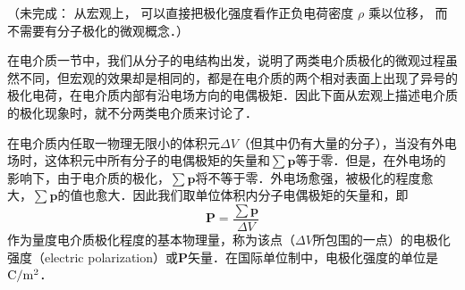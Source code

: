 

（未完成： 从宏观上， 可以直接把极化强度看作正负电荷密度 $\rho$ 乘以位移， 而不需要有分子极化的微观概念．）

在电介质一节中，我们从分子的电结构出发，说明了两类电介质极化的微观过程虽然不同，但宏观的效果却是相同的，都是在电介质的两个相对表面上出现了异号的极化电荷，在电介质内部有沿电场方向的电偶极矩．因此下面从宏观上描述电介质的极化现象时，就不分两类电介质来讨论了．

在电介质内任取一物理无限小的体积元$\Delta V$（但其中仍有大量的分子），当没有外电场时，这体积元中所有分子的电偶极矩的矢量和$\sum \mathbf p$等于零．但是，在外电场的影响下，由于电介质的极化，$\sum \mathbf p$将不等于零．外电场愈强，被极化的程度愈大，$\sum \mathbf p$的值也愈大．因此我们取单位体积内分子电偶极矩的矢量和，即
\begin{equation}
\mathbf P=\frac{\sum \mathbf p}{\Delta V} 
\end{equation}
作为量度电介质极化程度的基本物理量，称为该点（$\Delta V$所包围的一点）的电极化强度（electric polarization）或$\mathbf P$矢量．在国际单位制中，电极化强度的单位是$\rm C/m^2$．

